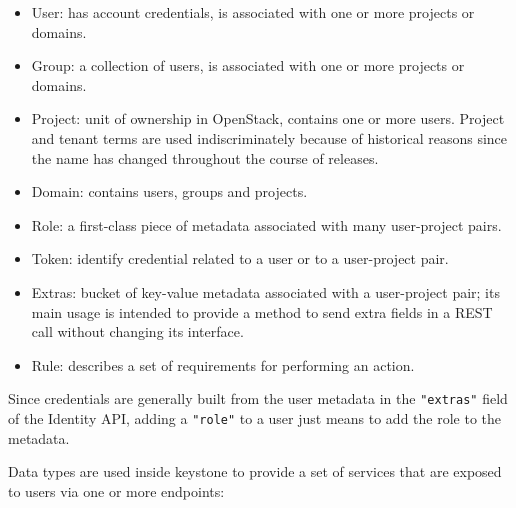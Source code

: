 \begin{itemize}

\item User: has account credentials, is associated with one or more projects or domains.

\item Group: a collection of users, is associated with one or more projects or domains.

\item Project: unit of ownership in OpenStack, contains one or more users. Project and tenant terms are used indiscriminately because of historical reasons since the name has changed throughout the course of releases.

\item Domain: contains users, groups and projects.

\item Role: a first-class piece of metadata associated with many user-project pairs.

\item Token: identify credential related to a user or to a user-project pair.

\item Extras: bucket of key-value metadata associated with a user-project pair; its main usage is intended to provide a method to send extra fields in a REST call without changing its interface.

\item Rule: describes a set of requirements for performing an action.

\end{itemize}

Since credentials are generally built from the user metadata in the \texttt{"extras"} field of the Identity API, adding a \texttt{"role"} to a user just means to add the role to the metadata.

Data types are used inside keystone to provide a set of services that are exposed to users via one or more endpoints:

